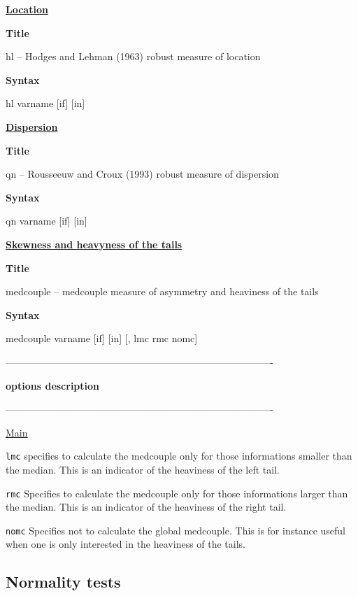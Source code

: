 \underline{\textbf{Location}}

\medskip

\textbf{Title}

hl -- Hodges and Lehman (1963) robust measure of location

\smallskip

\textbf{Syntax}

hl varname [if] [in]

\bigskip

\underline{\textbf{Dispersion}}

\medskip

\textbf{Title}

qn -- Rousseeuw and Croux (1993) robust measure of dispersion

\smallskip

\textbf{Syntax}

qn varname [if] [in]

\bigskip

\underline{\textbf{Skewness and heavyness of the tails}}

\medskip

\textbf{Title}

medcouple -- medcouple measure of asymmetry and heaviness of the tails

\smallskip

\textbf{Syntax}

medcouple varname [if] [in] [, lmc rmc nomc]

\bigskip

----------------------------------------------------------------------------------

\textbf{options description}

----------------------------------------------------------------------------------

\underline{Main} \smallskip

\texttt{lmc} specifies to calculate the medcouple only for those informations
smaller than the median. This is an indicator of the heaviness of the left tail.

\texttt{rmc} Specifies to calculate the medcouple only for those informations
larger than the median. This is an indicator of the heaviness of the right tail.

\texttt{nomc} Specifies not to calculate the global medcouple. This is for
instance useful when one is only interested in the heaviness of the tails.

\subsection{Normality tests}

